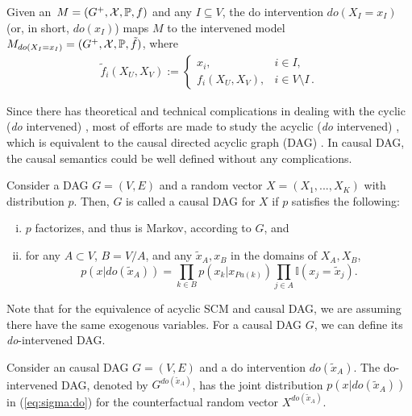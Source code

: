 \begin{Def}
	\label{def:p-intervention}
	Given an \SCM\,$M=(G^+,\mathcal{X},\mathbb{P}, f)$ and any $I \subseteq V$, the do intervention $do(X_I=x_I)$ (or, in short, $do(x_I)$) maps $M$ to the intervened model $M_{do(X_I = x_I)} = (G^+,\mathcal{X},\mathbb{P}, \tilde{f})$, where
	$$
	\begin{aligned}
	\tilde f_i(X_U,X_V) := \begin{cases}
	x_i, & i \in I, \\
	f_i(X_U,X_V), & i \in V \setminus I \,.
	\end{cases}
	\end{aligned}
	$$
\end{Def}



Since there has theoretical and technical complications in dealing with the cyclic (\emph{do} intervened) \SCM\cite{Bongers2016}, most of efforts are made to study the acyclic (\emph{do} intervened) \SCM, which is equivalent to the causal directed acyclic graph (DAG) \cite{Marloes2018}. In causal DAG, the causal semantics could be well defined without any complications.



\begin{Def}
	Consider a DAG $G=(V, E)$ and a random vector $X = (X_1, ..., X_K)$ with distribution $p$. Then, $G$ is called a causal DAG for $X$ if $p$ satisfies the following:
	\begin{enumerate}[(i)]
		\setlength\itemsep{0em}
		\item $p$ factorizes, and thus is Markov, according to $G$, and
		\item for any $A \subset V$, $B = V/A$,  and any $\tilde{x}_A, x_B$ in the domains of $X_A, X_B$,
		\begin{equation}\label{eq:sigma:do}
p(x	| do(\tilde{x}_A)) = \prod_{k \in B} p(x_k|x_{Pa(k)})  \prod_{j \in A} \mathbb{I}(x_j = \tilde{x}_j).
		\end{equation}
	\end{enumerate}
\end{Def}

Note that for the equivalence of acyclic SCM and causal DAG, we are assuming there have the same exogenous variables. For a causal DAG $G$, we can define its \emph{do}-intervened DAG. 

\begin{Def}
	Consider an causal DAG $G = (V, E)$ and a do intervention $do(\tilde{x}_A)$. The do-intervened DAG, denoted by $G^{do(\tilde{x}_A)}$, has the joint distribution $p(x| do(\tilde{x}_A))$ in (\ref{eq:sigma:do}) for the counterfactual random vector $X^{do(\tilde{x}_A)}$.
\end{Def}

